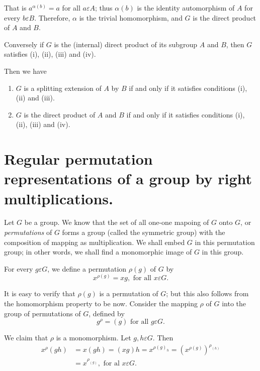 That is $a^{\alpha (b)}=a$ for all $a \varepsilon A$; thus $\alpha
(b)$ is the  identity automorphism of $A$ for every $b \varepsilon
B$. Therefore, $\alpha$ is the trivial homomorphism, and $G$ is the
direct product of $A$ and $B$. 

Conversely if $G$ is the (internal) direct product of its subgroup $A$
and $B$, then $G$ satisfies  (i), (ii), (iii) and (iv). 

Then we have 

\begin{Theorem} %
  \begin{enumerate}
    \renewcommand{\labelenumi}{\rm \theenumi.}
  \item $G$ is a splitting extension  of $A$ by $B$ if and only if it
    satisfies conditions (i), (ii) and (iii). 
  \item $G$ is the direct product of $A$ and $B$ if and only if it
    satisfies conditions (i), (ii), (iii) and (iv). 
  \end{enumerate}
\end{Theorem} 
 
\section{Regular permutation representations of a group by right
  multiplications.} %
 
Let $G$ be a group. We know that the set of  all one-one mapoing of
$G$ onto $G$, or \textit{permutations} of $G$ forms a group (called
the symmetric group) with the composition of mapping as
multiplication. We shall embed $G$ in this permutation  group; in
other words, we shall find a monomorphic image  of $G$ in this group. 
 
For every $g \varepsilon G$, we define a permutation $\rho (g)$ of $G$ by 
$$
x^{\rho (g)}= xg,  \text{ for all } x \varepsilon G.
$$
 
It is easy to verify that $\rho (g)$ is a permutation of $G$; but this
also follows from the homomorphism property to be now. Consider the
mapping $\rho$ of $G$ into the group of permutations of $G$, defined
by  
$$
g^\rho = (g) \text{ for all } g \varepsilon G.
$$
 
 We claim that $\rho$ is a monomorphism. Let $g,h \varepsilon G$. Then 
 \begin{align*}
   x^\rho (gh) & = x(gh) = (xg) h =x^{\rho(g)_h}= (x^{\rho (g)})^{\rho_{(h)}} \\
   &= x^{\rho_{(g)}}, \text{ for al } x \varepsilon G.
 \end{align*} 
 
